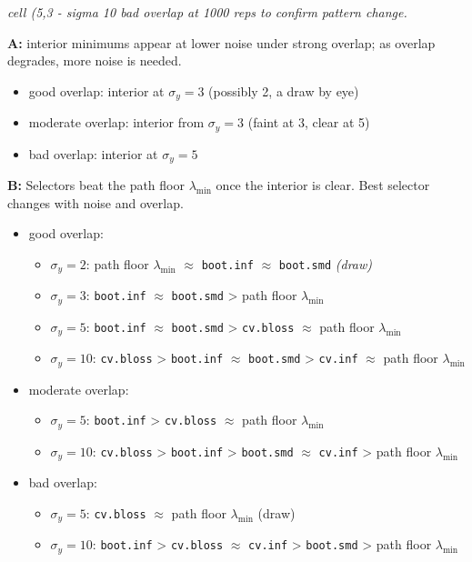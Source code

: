\documentclass[
  letterpaper,
  DIV=11,
  numbers=noendperiod]{scrartcl}
\providecommand{\tightlist}{%
  \setlength{\itemsep}{0pt}\setlength{\parskip}{0pt}}
\begin{document}
\emph{cell (5,3 - sigma 10 bad overlap at 1000 reps to confirm pattern
change.}

\textbf{A:} interior minimums appear at lower noise under strong
overlap; as overlap degrades, more noise is needed.

\begin{itemize}
\tightlist
\item
  good overlap: interior at \(\sigma_y = 3\) (possibly 2, a draw by eye)
\item
  moderate overlap: interior from \(\sigma_y = 3\) (faint at 3, clear at
  5)
\item
  bad overlap: interior at \(\sigma_y = 5\)
\end{itemize}

\textbf{B:} Selectors beat the path floor \(\lambda_{\min}\) once the
interior is clear. Best selector changes with noise and overlap.

\begin{itemize}
\tightlist
\item
  good overlap:

  \begin{itemize}
  \tightlist
  \item
    \(\sigma_y = 2\): path floor \(\lambda_{\min}\) \(\approx\)
    \texttt{boot.inf} \(\approx\) \texttt{boot.smd} \emph{(draw)}
  \item
    \(\sigma_y = 3\): \texttt{boot.inf} \(\approx\) \texttt{boot.smd}
    \textgreater{} path floor \(\lambda_{\min}\)
  \item
    \(\sigma_y = 5\): \texttt{boot.inf} \(\approx\) \texttt{boot.smd}
    \textgreater{} \texttt{cv.bloss} \(\approx\) path floor
    \(\lambda_{\min}\)
  \item
    \(\sigma_y = 10\): \texttt{cv.bloss} \textgreater{}
    \texttt{boot.inf} \(\approx\) \texttt{boot.smd} \textgreater{}
    \texttt{cv.inf} \(\approx\) path floor \(\lambda_{\min}\)
  \end{itemize}
\item
  moderate overlap:

  \begin{itemize}
  \tightlist
  \item
    \(\sigma_y = 5\): \texttt{boot.inf} \textgreater{} \texttt{cv.bloss}
    \(\approx\) path floor \(\lambda_{\min}\)
  \item
    \(\sigma_y = 10\): \texttt{cv.bloss} \textgreater{}
    \texttt{boot.inf} \textgreater{} \texttt{boot.smd} \(\approx\)
    \texttt{cv.inf} \textgreater{} path floor \(\lambda_{\min}\)
  \end{itemize}
\item
  bad overlap:

  \begin{itemize}
  \tightlist
  \item
    \(\sigma_y = 5\): \texttt{cv.bloss} \(\approx\) path floor
    \(\lambda_{\min}\) (draw)
  \item
    \(\sigma_y = 10\): \texttt{boot.inf} \textgreater{}
    \texttt{cv.bloss} \(\approx\) \texttt{cv.inf} \textgreater{}
    \texttt{boot.smd} \textgreater{} path floor \(\lambda_{\min}\)
  \end{itemize}
\end{itemize}
\end{document}
